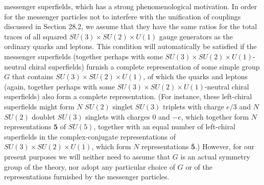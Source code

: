 
messenger superfields, which has a strong phenomenological motivation. In
order for the messenger particles not to interfere with the unification of
couplings discussed in Section 28.2, we assume that they have the same
ratios for the total traces of all squared
\(SU(3)\times SU(2)\times U(1)\) gauge generators as the
ordinary quarks and leptons. This condition will automatically be satisfied
if the messenger superfields (together perhaps with some
\(SU(3)\times SU(2)\times U(1)\)-neutral chiral
superfields) furnish a complete representation of some simple group \(G\)
that contains \(SU(3)\times SU(2)\times U(1)\), of which
the quarks and leptons (again, together perhaps with some
\(SU(3)\times SU(2)\times U(1)\)-neutral chiral
superfields) also form a complete representation. (For instance, these
left-chiral superfields might form \(N\) \(SU(2)\) singlet \(SU(3)\)
triplets with charge \(e/3\) and \(N\) \(SU(2)\) doublet \(SU(3)\) singlets
with charges 0 and \(-e\), which together form \(N\) representations
\(\mathbf{5}\) of \(SU(5)\), together with an equal number of left-chiral
superfields in the complex-conjugate representations of
\(SU(3)\times SU(2)\times U(1)\), which form \(N\)
representations \(\bar{\mathbf{5}}\).) However, for our present purposes we
will neither need to assume that \(G\) is an actual symmetry group of the
theory, nor adopt any particular choice of \(G\) or of the representations
furnished by the messenger particles.

